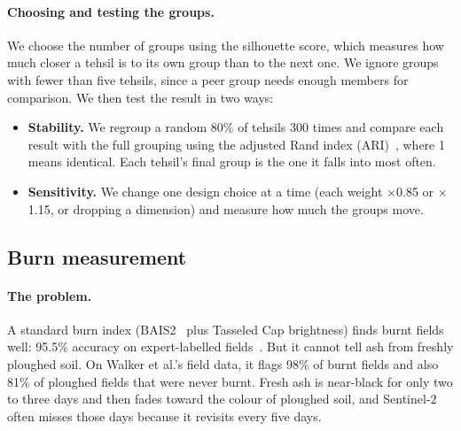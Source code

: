 \documentclass[sigconf,nonacm]{acmart}
\begin{document}
\paragraph{Choosing and testing the groups.} We choose the number of groups using the silhouette score, which measures how much closer a tehsil is to its own group than to the next one. We ignore groups with fewer than five tehsils, since a peer group needs enough members for comparison. We then test the result in two ways:
\begin{itemize}
  \item \textbf{Stability.} We regroup a random 80\% of tehsils 300 times and compare each result with the full grouping using the adjusted Rand index (ARI)~\cite{hubert1985ari}, where 1 means identical. Each tehsil's final group is the one it falls into most often.
  \item \textbf{Sensitivity.} We change one design choice at a time (each weight $\times$0.85 or $\times$1.15, or dropping a dimension) and measure how much the groups move.
\end{itemize}

\subsection{Burn measurement}
\label{sec:measure}

\paragraph{The problem.} A standard burn index (BAIS2~\cite{filipponi2018bais2} plus Tasseled Cap brightness) finds burnt fields well: 95.5\% accuracy on expert-labelled fields~\cite{ceew2026patterns}. But it cannot tell ash from freshly ploughed soil. On Walker et al.'s field data, it flags 98\% of burnt fields and also 81\% of ploughed fields that were never burnt. Fresh ash is near-black for only two to three days and then fades toward the colour of ploughed soil, and Sentinel-2 often misses those days because it revisits every five days.
\end{document}
